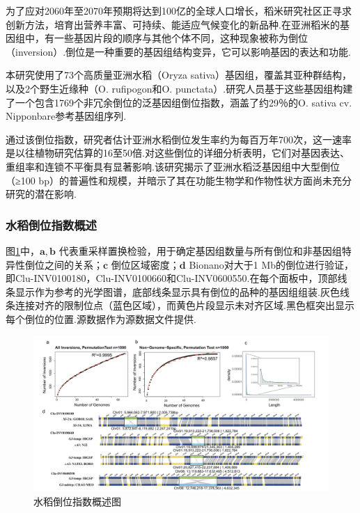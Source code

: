 为了应对2060年至2070年预期将达到100亿的全球人口增长，稻米研究社区正寻求创新方法，培育出营养丰富、可持续、能适应气候变化的新品种.在亚洲稻米的基因组中，有一些基因片段的顺序与其他个体不同，这种现象被称为倒位（inversion）\cite{rice}.倒位是一种重要的基因组结构变异，它可以影响基因的表达和功能.

本研究使用了73个高质量亚洲水稻（Oryza sativa）基因组，覆盖其亚种群结构，以及2个野生近缘种（O. rufipogon和O. punctata）.研究人员基于这些基因组构建了一个包含1769个非冗余倒位的泛基因组倒位指数，涵盖了约29％的O. sativa cv. Nipponbare参考基因组序列.

通过该倒位指数，研究者估计亚洲水稻倒位发生率约为每百万年700次，这一速率是以往植物研究估算的16至50倍.对这些倒位的详细分析表明，它们对基因表达、重组率和连锁不平衡具有显著影响.该研究揭示了亚洲水稻泛基因组中大型倒位（≥100 bp）的普遍性和规模，并暗示了其在功能生物学和作物性状方面尚未充分研究的潜在影响.

\subsubsection{水稻倒位指数概述}

图\ref{invsum}中，$\mathbf{a}, \mathbf{b}$ 代表重采样置换检验，用于确定基因组数量与所有倒位和非基因组特异性倒位之间的关系；$ \mathbf{c} $ 倒位区域密度；$ \mathbf{d} $ Bionano对大于1 Mb的倒位进行验证，即Clu-INV0100180，Clu-INV0100660和Clu-INV0600550.在每个面板中，顶部线条显示作为参考的光学图谱，底部线条显示具有倒位的品种的基因组组装.灰色线条连接对齐的限制位点（蓝色区域），而黄色片段显示未对齐区域.黑色框突出显示每个倒位的位置.源数据作为源数据文件提供.

\begin{figure}[htp!]
	\centering
	\includegraphics[width=1\linewidth]{figure/invsum}
	\caption{水稻倒位指数概述图} \label{invsum}
\end{figure}

